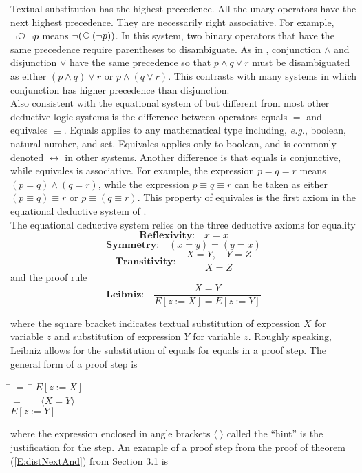 \documentclass[fleqn, leqno]{article}
\newcommand{\lgap}{2pt}                             %
\newcommand{\mymathindent}{24pt}                    %
\newcommand{\Next}{\;\,\text{\raisebox{3.5pt}{\circle{6}}}}
\newcommand{\Gll} {\langle}                         %
\newcommand{\Ggg} {\rangle}                         %
\newcommand{\Hint}[1]     {\ \ \ $\Gll              \mbox{#1} \Ggg$ }   %
\begin{document}
Textual substitution has the highest precedence.
All the unary operators have the next highest precedence.
They are necessarily right associative.
For example, $\neg \Next \neg p$ means $\neg (\Next (\neg p))$.
In this system, two binary operators that have the same precedence require parentheses to disambiguate.
As in \cite{LADM}, conjunction $\land$ and disjunction $\lor$ have the same precedence so that $p\land q\lor r$
must be disambiguated as either $(p\land q)\lor r$ or $p\land (q\lor r)$.
This contrasts with many systems in which conjunction has higher precedence than disjunction.\\

Also consistent with the equational system of \cite{LADM} but different from most other deductive logic systems
is the difference between operators equals $=$ and equivales $\equiv$.
Equals applies to any mathematical type including, {\itshape e.g.\/}, boolean, natural number, and set.
Equivales applies only to boolean, and is commonly denoted $\leftrightarrow$ in other systems.
Another difference is that equals is conjunctive, while equivales is associative.
For example, the expression $p = q = r$ means $(p = q) \land (q = r)$, while the expression $p \equiv q \equiv r$
can be taken as either $(p \equiv q) \equiv r$ or $p \equiv (q \equiv r)$.
This property of equivales is the first axiom in the equational deductive system of \cite{LADM}.
\\

The equational deductive system relies on the three deductive axioms for equality
\[
\textbf{Reflexivity:}\quad x=x
\]
\[
\textbf{Symmetry:}\quad (x=y) = (y=x)
\]
\[
\textbf{Transitivity:}\quad \frac{X=Y, \quad Y=Z}{X=Z}
\]
and the proof rule
\[
\textbf{Leibniz:}\quad \frac{X=Y}{E[z:=X]=E[z:=Y]}
\]

where the square bracket indicates textual substitution of expression $X$ for variable $z$ and substitution
of expression $Y$ for variable $z$.
Roughly speaking, Leibniz allows for the substitution of equals for equals in a proof step.
The general form of a proof step is

\begin{tabbing}
\hspace{\mymathindent} \= $= \;$ \=  \kill
  \> \>   $E[z:=X]$\\[\lgap]
  \> $=$  \>  \Hint{$X=Y$} \\[\lgap]
  \> \>   $E[z:=Y]$
\end{tabbing}

where the expression enclosed in angle brackets $\Gll\;\Ggg$ called the ``hint'' is the justification for the step.
An example of a proof step from the proof of theorem (\ref{E:distNextAnd}) from Section 3.1 is
\end{document}
